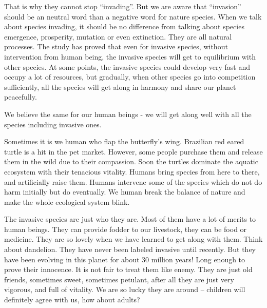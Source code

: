 \documentclass[12pt]{article}
\begin{document}
That is why they cannot stop ``invading''.  But we are aware that ``invasion'' should be an neutral word than a negative word for nature species.  When we talk about species invading, it should be no difference from talking about species emergence, prosperity, mutation or even extinction.  They are all natural processes.  The study has proved that even for invasive species, without intervention from human being, the invasive species will get to equilibrium with other species.  At some points, the invasive species could develop very fast and occupy a lot of resources, but gradually, when other species go into competition sufficiently, all the species will get along in harmony and share our planet peacefully.

We believe the same for our human beings - we will get along well with all the species including invasive ones.

Sometimes it is we human who flap the butterfly's wing.  Brazilian red eared turtle is a hit in the pet market. However, some people purchase them and release them in the wild due to their compassion. Soon the turtles dominate the aquatic ecosystem with their tenacious vitality.  Humans bring species from here to there, and artificially raise them.  Humans intervene some of the species which do not do harm initially but do eventually.  We human break the balance of nature and make the whole ecological system blink.

The invasive species are just who they are.  Most of them have a lot of merits to human beings.  They can provide fodder to our livestock, they can be food or medicine.  They are so lovely when we have learned to get along with them.  Think about dandelion.  They have never been labeled invasive until recently.  But they have been evolving in this planet for about 30 million years! Long enough to prove their innocence.  It is not fair to treat them like enemy.  They are just old friends, sometimes sweet, sometimes petulant, after all they are just very vigorous, and full of vitality.  We are so lucky they are around -- children will definitely agree with us, how about adults?
\end{document}
